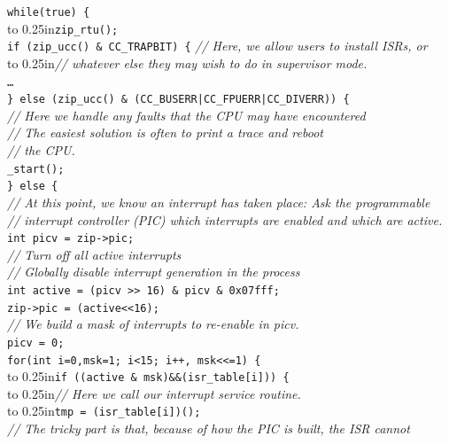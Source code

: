 \documentclass{gqtekspec}
\begin{document}
\begin{table}\begin{center}
\begin{tabbing}
{\tt while(true) \{} \\
\hbox to 0.25in{}\= {\tt zip\_rtu();}\\
	\> {\tt if (zip\_ucc() \& CC\_TRAPBIT) \{} {\em // Here, we allow users to install ISRs, or} \\
	\>\hbox to 0.25in{}\= {\em // whatever else they may wish to do in supervisor mode.} \\
	\>\> {\tt \ldots} \\
	\> {\tt \} else (zip\_ucc() \& (CC\_BUSERR|CC\_FPUERR|CC\_DIVERR)) \{}\\
	\>\> {\em // Here we handle any faults that the CPU may have
		encountered }\\
	\>\> {\em // The easiest solution is often to print a trace and reboot}\\
	\>\> {\em // the CPU.}\\
	\>\> {\tt \_start();} \\
	\> {\tt \} else \{} \\
	\> \> {\em // At this point, we know an interrupt has taken place:  Ask the programmable}\\
	\> \> {\em // interrupt controller (PIC) which interrupts are enabled and which are active.}\\
	\> \>	{\tt int	picv = zip->pic;}\\
	\> \>	{\em // Turn off all active interrupts}\\
	\> \>	{\em // Globally disable interrupt generation in the process}\\
	\> \>	{\tt int	active = (picv >> 16) \& picv \& 0x07fff;}\\
	\> \>	{\tt zip->pic = (active<<16);}\\
	\> \>	{\em // We build a mask of interrupts to re-enable in picv.}\\
	\> \>	{\tt picv = 0;}\\
	\> \>	{\tt for(int i=0,msk=1; i<15; i++, msk<<=1) \{}\\
	\> \>\hbox to 0.25in{}\={\tt if ((active \& msk)\&\&(isr\_table[i])) \{}\\
	\> \>\>\hbox to 0.25in{}\={\em // Here we call our interrupt service routine.}\\
	\> \>\>\hbox to 0.25in{}\= {\tt tmp = (isr\_table[i])(); }\\
	\> \>\>\>	{\em // The tricky part is that, because of how the PIC is built, the ISR cannot}\\

\end{tabbing}
\end{center}
\end{table}
\end{document}
